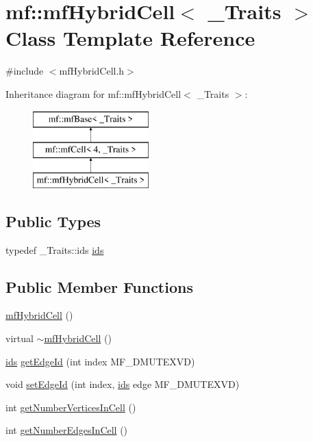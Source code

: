 \hypertarget{classmf_1_1mfHybridCell}{
\section{mf::mfHybridCell$<$ \_\-Traits $>$ Class Template Reference}
\label{classmf_1_1mfHybridCell}
}


{\ttfamily \#include $<$mfHybridCell.h$>$}

Inheritance diagram for mf::mfHybridCell$<$ \_\-Traits $>$:\begin{figure}[H]
\begin{center}
\leavevmode
\includegraphics[height=3.000000cm]{classmf_1_1mfHybridCell}
\end{center}
\end{figure}
\subsection*{Public Types}
\begin{DoxyCompactItemize}
\item 
typedef \_\-Traits::ids \hyperlink{classmf_1_1mfHybridCell_afcc1603f9fd31f5e82fc0f2175aa74d2}{ids}
\end{DoxyCompactItemize}
\subsection*{Public Member Functions}
\begin{DoxyCompactItemize}
\item 
\hyperlink{classmf_1_1mfHybridCell_a526117a90df3cb8a4413836848da8075}{mfHybridCell} ()
\item 
virtual \hyperlink{classmf_1_1mfHybridCell_a228b2863f54124331dda1666afad420b}{$\sim$mfHybridCell} ()
\item 
\hyperlink{classmf_1_1mfBase_a3b23f16ddf59da0a91ab12cf57c1f111}{ids} \hyperlink{classmf_1_1mfHybridCell_ab58d17515251ea065b1b54f32a91fb72}{getEdgeId} (int index MF\_\-DMUTEXVD)
\item 
void \hyperlink{classmf_1_1mfHybridCell_a45b53202d66076c7b9227b5f4897a0ed}{setEdgeId} (int index, \hyperlink{classmf_1_1mfBase_a3b23f16ddf59da0a91ab12cf57c1f111}{ids} edge MF\_\-DMUTEXVD)
\item 
int \hyperlink{classmf_1_1mfHybridCell_a39449ac79227d63f7cf505305ceb89d0}{getNumberVerticesInCell} ()
\item 
int \hyperlink{classmf_1_1mfHybridCell_a5fc9ef1bea17984822cf28d0ed6dde20}{getNumberEdgesInCell} ()
\end{DoxyCompactItemize}
